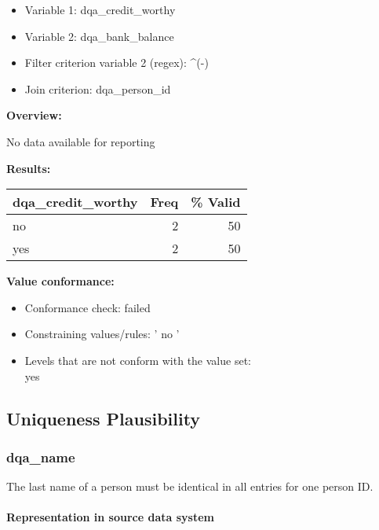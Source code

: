 \documentclass[
]{article}
\providecommand{\tightlist}{%
  \setlength{\itemsep}{0pt}\setlength{\parskip}{0pt}}
\begin{document}
\begin{itemize}
\tightlist
\item
  Variable 1: dqa\_credit\_worthy
\item
  Variable 2: dqa\_bank\_balance
\item
  Filter criterion variable 2 (regex): \^{}(-)
\item
  Join criterion: dqa\_person\_id
\end{itemize}

\textbf{Overview:}

No data available for reporting

\textbf{Results:}\\

\begin{table}[H]
\centering
\begin{tabular}{l|r|r}
\hline
\textbf{dqa\_credit\_worthy} & \textbf{Freq} & \textbf{\% Valid}\\
\hline
no & 2 & 50\\
\hline
yes & 2 & 50\\
\hline
\end{tabular}
\end{table}

\textbf{Value conformance:}

\begin{itemize}
\tightlist
\item
  Conformance check: failed
\item
  Constraining values/rules: ' no '
\item
  Levels that are not conform with the value set:\\
  yes
\end{itemize}

\hypertarget{uniqueness-plausibility}{%
\subsection{Uniqueness Plausibility}\label{uniqueness-plausibility}}

\hypertarget{dqa_name}{%
\subsubsection{dqa\_name}\label{dqa_name}}

The last name of a person must be identical in all entries for one
person ID.

\hypertarget{representation-in-source-data-system-13}{%
\paragraph{Representation in source data
system}\label{representation-in-source-data-system-13}}
\end{document}
